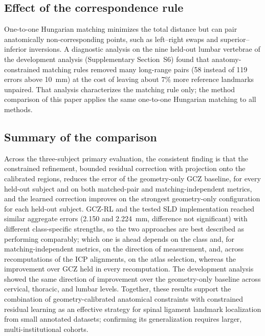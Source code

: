 \documentclass[5p,times,twocolumn,authoryear]{elsarticle}
\newif\ifhighlight
\newcommand{\rev}[1]{\ifhighlight{\color{revcolor}#1}\else#1\fi}
\begin{document}
\subsection{Effect of the correspondence rule}

One-to-one Hungarian matching minimizes the total distance but can pair anatomically non-corresponding points, such as left--right swaps and superior--inferior inversions. A diagnostic analysis on the nine held-out lumbar vertebrae of the development analysis (Supplementary Section~S6) found that anatomy-constrained matching rules removed many long-range pairs (58 instead of 119 errors above 10~mm) at the cost of leaving about 7\% more reference landmarks unpaired. That analysis characterizes the matching rule only; the method comparison of this paper applies the same one-to-one Hungarian matching to all methods.

\subsection{Summary of the comparison}

Across the three-subject primary evaluation, the consistent finding is that \rev{the constrained refinement, bounded residual correction with projection onto the calibrated regions,} reduces the error of the geometry-only GCZ baseline, for every held-out subject and on both matched-pair and matching-independent metrics\rev{, and the learned correction improves on the strongest geometry-only configuration for each held-out subject}. GCZ-RL and the tested SLD implementation reached similar aggregate errors (2.150 and 2.224~mm, difference not significant) with different class-specific strengths, so the two approaches are best described as performing comparably; which one is ahead depends on the class and, for matching-independent metrics, on the direction of measurement\rev{, and, across recomputations of the ICP alignments, on the atlas selection, whereas the improvement over GCZ held in every recomputation}. The development analysis showed the same direction of improvement over the geometry-only baseline across cervical, thoracic, and lumbar levels. Together, these results support the combination of geometry-calibrated anatomical constraints with constrained residual learning as an effective strategy for spinal ligament landmark localization from small annotated datasets; confirming its generalization requires larger, multi-institutional cohorts.

\end{document}
